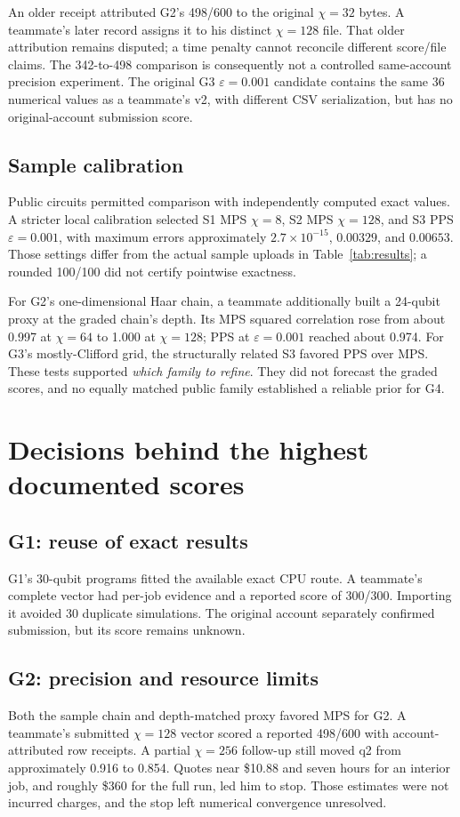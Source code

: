 \documentclass[11pt]{article}
\newcommand{\eps}{\varepsilon}
\begin{document}
An older receipt attributed G2's 498/600 to the original $\chi=32$ bytes. A teammate's later record assigns it to his distinct $\chi=128$ file. That older attribution remains disputed; a time penalty cannot reconcile different score/file claims. The 342-to-498 comparison is consequently not a controlled same-account precision experiment. The original G3 $\eps=0.001$ candidate contains the same 36 numerical values as a teammate's v2, with different CSV serialization, but has no original-account submission score.\cite{ledger}

\subsection*{Sample calibration}
Public circuits permitted comparison with independently computed exact values. A stricter local calibration selected S1 MPS $\chi=8$, S2 MPS $\chi=128$, and S3 PPS $\eps=0.001$, with maximum errors approximately $2.7\times10^{-15}$, $0.00329$, and $0.00653$. Those settings differ from the actual sample uploads in Table~\ref{tab:results}; a rounded 100/100 did not certify pointwise exactness.\cite{calibration}

For G2's one-dimensional Haar chain, a teammate additionally built a 24-qubit proxy at the graded chain's depth. Its MPS squared correlation rose from about 0.997 at $\chi=64$ to 1.000 at $\chi=128$; PPS at $\eps=0.001$ reached about 0.974. For G3's mostly-Clifford grid, the structurally related S3 favored PPS over MPS. These tests supported \emph{which family to refine}. They did not forecast the graded scores, and no equally matched public family established a reliable prior for G4.\cite{teammate-1}

\newpage
\section{Decisions behind the highest documented scores}
\subsection{G1: reuse of exact results}
G1's 30-qubit programs fitted the available exact CPU route. A teammate's complete vector had per-job evidence and a reported score of 300/300. Importing it avoided 30 duplicate simulations. The original account separately confirmed submission, but its score remains unknown.\cite{teammate-1,ledger}

\subsection{G2: precision and resource limits}
Both the sample chain and depth-matched proxy favored MPS for G2. A teammate's submitted $\chi=128$ vector scored a reported 498/600 with account-attributed row receipts. A partial $\chi=256$ follow-up still moved q2 from approximately 0.916 to 0.854. Quotes near \$10.88 and seven hours for an interior job, and roughly \$360 for the full run, led him to stop. Those estimates were not incurred charges, and the stop left numerical convergence unresolved.\cite{teammate-1,ledger}
\end{document}
